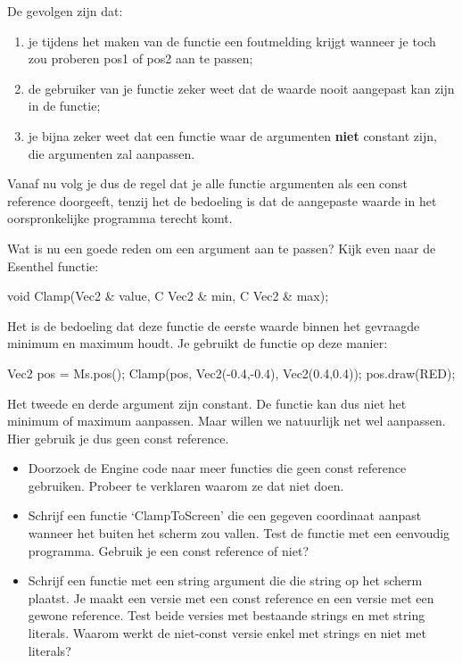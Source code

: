 De gevolgen zijn dat:

\begin{enumerate}
	\item je tijdens het maken van de functie een foutmelding krijgt wanneer je toch zou proberen pos1 of pos2 aan te passen;
	\item de gebruiker van je functie zeker weet dat de waarde nooit aangepast kan zijn in de functie;
	\item je bijna zeker weet dat een functie waar de argumenten \textbf{niet} constant zijn, die argumenten zal aanpassen.
\end{enumerate}

Vanaf nu volg je dus de regel dat je alle functie argumenten als een const reference doorgeeft, tenzij het de bedoeling is dat de aangepaste waarde in het oorspronkelijke programma terecht komt.

Wat is nu een goede reden om een argument aan te passen? Kijk even naar de Esenthel functie:
\begin{code}
void Clamp(Vec2 & value, C Vec2 & min, C Vec2 & max);
\end{code}

Het is de bedoeling dat deze functie de eerste waarde binnen het gevraagde minimum en maximum houdt. Je gebruikt de functie op deze manier:

\begin{code}
Vec2 pos = Ms.pos();
Clamp(pos, Vec2(-0.4,-0.4), Vec2(0.4,0.4));
pos.draw(RED);
\end{code}

Het tweede en derde argument zijn constant. De functie  kan dus niet het minimum of maximum aanpassen. Maar  willen we natuurlijk net wel aanpassen. Hier gebruik je dus geen const reference.

\begin{exercise}
\begin{itemize}
	\item Doorzoek de Engine code naar meer functies die geen const reference gebruiken. Probeer te verklaren waarom ze dat niet doen.
	\item Schrijf een functie `ClampToScreen' die een gegeven coordinaat aanpast wanneer het buiten het scherm zou vallen. Test de functie met een eenvoudig programma. Gebruik je een const reference of niet?
	\item Schrijf een functie met een string argument die die string op het scherm plaatst. Je maakt een versie met een const reference en een versie met een gewone reference. Test beide versies met bestaande strings en met string literals. Waarom werkt de niet-const versie enkel met strings en niet met literals?
\end{itemize}
\end{exercise}